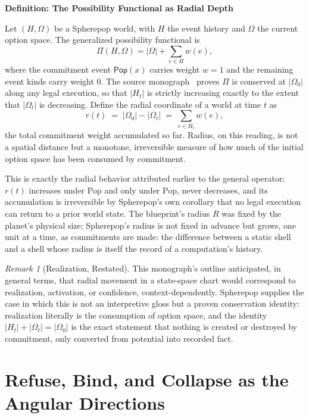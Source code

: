 \documentclass[11pt,fleqn]{book}
\numberwithin{equation}{chapter}
\newenvironment{definition}[1]
  {\begin{definitionEnv}
   \noindent\textbf{Definition: #1}\par\smallskip}
  {\end{definitionEnv}}
\theoremstyle{plain}
\theoremstyle{definition}
\theoremstyle{remark}
\newtheorem{remark}[theorem]{Remark}
\providecommand{\Pop}{\mathsf{Pop}}
\begin{document}
\begin{definition}{The Possibility Functional as Radial Depth}
Let \((H,\Omega)\) be a Spherepop world, with \(H\) the event history and \(\Omega\) the current option space. The generalized possibility functional is
\[
\Pi(H,\Omega) = |\Omega| + \sum_{e\in H} w(e),
\]
where the commitment event \(\Pop(x)\) carries weight \(w=1\) and the remaining event kinds carry weight \(0\). The source monograph~\cite{spherepop-histories} proves \(\Pi\) is conserved at \(|\Omega_0|\) along any legal execution, so that \(|H_t|\) is strictly increasing exactly to the extent that \(|\Omega_t|\) is decreasing. Define the radial coordinate of a world at time \(t\) as
\[
r(t) \;=\; |\Omega_0| - |\Omega_t| \;=\; \sum_{e\in H_t} w(e),
\]
the total commitment weight accumulated so far. Radius, on this reading, is not a spatial distance but a monotone, irreversible measure of how much of the initial option space has been consumed by commitment.
\end{definition}

This is exactly the radial behavior attributed earlier to the general operator: \(r(t)\) increases under Pop and only under Pop, never decreases, and its accumulation is irreversible by Spherepop's own corollary that no legal execution can return to a prior world state. The blueprint's radius \(R\) was fixed by the planet's physical size; Spherepop's radius is not fixed in advance but grows, one unit at a time, as commitments are made: the difference between a static shell and a shell whose radius is itself the record of a computation's history.

\begin{remark}[Realization, Restated]
This monograph's outline anticipated, in general terms, that radial movement in a state-space chart would correspond to realization, activation, or confidence, context-dependently. Spherepop supplies the case in which this is not an interpretive gloss but a proven conservation identity: realization literally is the consumption of option space, and the identity \(|H_t|+|\Omega_t|=|\Omega_0|\) is the exact statement that nothing is created or destroyed by commitment, only converted from potential into recorded fact.
\end{remark}

\section{Refuse, Bind, and Collapse as the Angular Directions}
\end{document}
